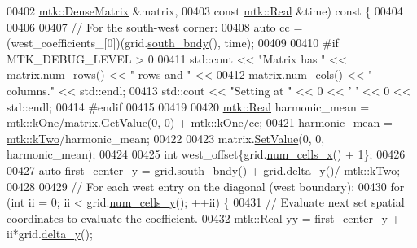 \begin{DoxyCode}
00402     \hyperlink{classmtk_1_1DenseMatrix}{mtk::DenseMatrix} &matrix,
00403     \textcolor{keyword}{const} \hyperlink{group__c01-roots_gac080bbbf5cbb5502c9f00405f894857d}{mtk::Real} &time)\textcolor{keyword}{ const }\{
00404 
00406 
00407   \textcolor{comment}{// For the south-west corner:}
00408   \textcolor{keyword}{auto} cc = (west\_coefficients\_[0])(grid.\hyperlink{classmtk_1_1UniStgGrid2D_a1442eaf219f099d0ebf46a170fdebf92}{south\_bndy}(), time);
00409 
00410 \textcolor{preprocessor}{  #if MTK\_DEBUG\_LEVEL > 0}
00411   std::cout << \textcolor{stringliteral}{"Matrix has "} << matrix.\hyperlink{classmtk_1_1DenseMatrix_a53f3afb3b6a8d21854458aaa9663cc74}{num\_rows}() << \textcolor{stringliteral}{" rows and "} <<
00412     matrix.\hyperlink{classmtk_1_1DenseMatrix_a41747502d468c6728a4be31501b16e0e}{num\_cols}() << \textcolor{stringliteral}{" columns."} << std::endl;
00413   std::cout << \textcolor{stringliteral}{"Setting at "} << 0 << \textcolor{charliteral}{' '} << 0 << std::endl;
00414 \textcolor{preprocessor}{  #endif}
00415 
00419 
00420   \hyperlink{group__c01-roots_gac080bbbf5cbb5502c9f00405f894857d}{mtk::Real} harmonic\_mean = \hyperlink{group__c01-roots_ga26407c24d43b6b95480943340d285c71}{mtk::kOne}/matrix.\hyperlink{classmtk_1_1DenseMatrix_a4b23ecbebd970b5eea915dbb50691024}{GetValue}(0, 0) + 
      \hyperlink{group__c01-roots_ga26407c24d43b6b95480943340d285c71}{mtk::kOne}/cc;
00421   harmonic\_mean = \hyperlink{group__c01-roots_gaf39c2d851a2db744f4feb1c5ab3ec2cf}{mtk::kTwo}/harmonic\_mean;
00422 
00423   matrix.\hyperlink{classmtk_1_1DenseMatrix_a784ce5784109ac86bfb9d8562b334b13}{SetValue}(0, 0, harmonic\_mean);
00424 
00425   \textcolor{keywordtype}{int} west\_offset\{grid.\hyperlink{classmtk_1_1UniStgGrid2D_a2d182866a398aba8e4829590e85bf939}{num\_cells\_x}() + 1\};
00426 
00427   \textcolor{keyword}{auto} first\_center\_y = grid.\hyperlink{classmtk_1_1UniStgGrid2D_a1442eaf219f099d0ebf46a170fdebf92}{south\_bndy}() + grid.\hyperlink{classmtk_1_1UniStgGrid2D_a65a78cfc80ffdbeb282ed57af4dc5cb4}{delta\_y}()/
      \hyperlink{group__c01-roots_gaf39c2d851a2db744f4feb1c5ab3ec2cf}{mtk::kTwo};
00428 
00429   \textcolor{comment}{// For each west entry on the diagonal (west boundary):}
00430   \textcolor{keywordflow}{for} (\textcolor{keywordtype}{int} ii = 0; ii < grid.\hyperlink{classmtk_1_1UniStgGrid2D_aed05a801cc9a76dba0ff203cea58a61a}{num\_cells\_y}(); ++ii) \{
00431     \textcolor{comment}{// Evaluate next set spatial coordinates to evaluate the coefficient.}
00432     \hyperlink{group__c01-roots_gac080bbbf5cbb5502c9f00405f894857d}{mtk::Real} yy = first\_center\_y + ii*grid.\hyperlink{classmtk_1_1UniStgGrid2D_a65a78cfc80ffdbeb282ed57af4dc5cb4}{delta\_y}();

\end{DoxyCode}
